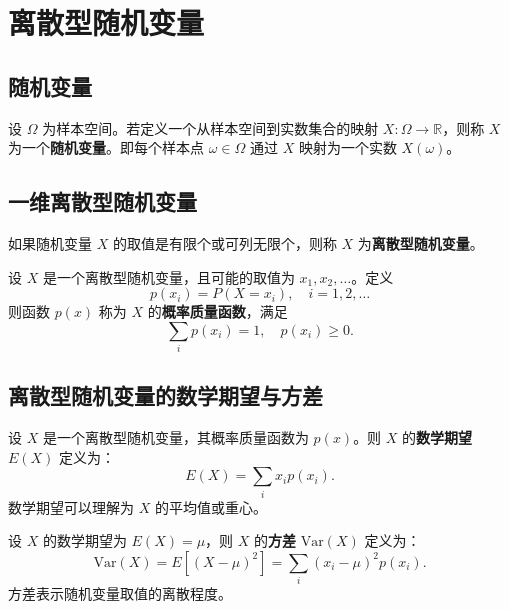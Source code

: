 \documentclass[UTF8]{ctexart}
\begin{document}
	\section{离散型随机变量}
	
	\subsection{随机变量}
	
	\begin{tcolorbox}[colback=definition!5!white, colframe=definition!75!black, title=随机变量]
		设 $\Omega$ 为样本空间。若定义一个从样本空间到实数集合的映射 $X: \Omega \rightarrow \mathbb{R}$，则称 $X$ 为一个\textbf{随机变量}。即每个样本点 $\omega \in \Omega$ 通过 $X$ 映射为一个实数 $X(\omega)$。
	\end{tcolorbox}
	
	\subsection{一维离散型随机变量}
	
	\begin{tcolorbox}[colback=definition!5!white, colframe=definition!75!black, title=离散型随机变量]
		如果随机变量 $X$ 的取值是有限个或可列无限个，则称 $X$ 为\textbf{离散型随机变量}。
	\end{tcolorbox}
	
	\begin{tcolorbox}[colback=definition!5!white, colframe=definition!75!black, title=概率质量函数]
		设 $X$ 是一个离散型随机变量，且可能的取值为 $x_1, x_2, \dots$。定义
		\[
		p(x_i) = P(X = x_i), \quad i = 1, 2, \dots
		\]
		则函数 $p(x)$ 称为 $X$ 的\textbf{概率质量函数}，满足
		\[
		\sum_{i} p(x_i) = 1, \quad p(x_i) \geq 0.
		\]
	\end{tcolorbox}
	
	\subsection{离散型随机变量的数学期望与方差}
	
	\begin{tcolorbox}[colback=definition!5!white, colframe=definition!75!black, title=数学期望]
		设 $X$ 是一个离散型随机变量，其概率质量函数为 $p(x)$。则 $X$ 的\textbf{数学期望} $E(X)$ 定义为：
		\[
		E(X) = \sum_{i} x_i p(x_i).
		\]
		数学期望可以理解为 $X$ 的平均值或重心。
	\end{tcolorbox}
	
	\begin{tcolorbox}[colback=definition!5!white, colframe=definition!75!black, title=方差]
		设 $X$ 的数学期望为 $E(X) = \mu$，则 $X$ 的\textbf{方差} $\text{Var}(X)$ 定义为：
		\[
		\text{Var}(X) = E\left[(X - \mu)^2\right] = \sum_{i} (x_i - \mu)^2 p(x_i).
		\]
		方差表示随机变量取值的离散程度。
	\end{tcolorbox}
	
\end{document}
